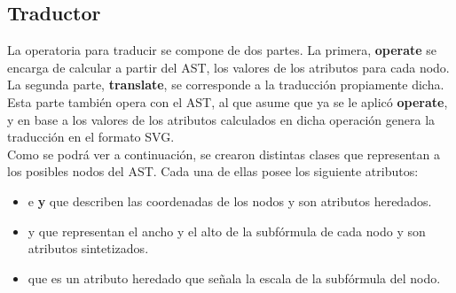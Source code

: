 \subsection{Traductor}

\indent \indent  La operatoria para traducir se compone de dos partes. La primera, \textbf{operate} se encarga de calcular a partir del AST, los valores de los atributos para cada nodo. La segunda parte, \textbf{translate}, se corresponde a la traducción propiamente dicha. Esta parte también opera con el AST, al que asume que ya se le aplicó \textbf{operate}, y en base a los valores de los atributos calculados en dicha operación genera la traducción en el formato SVG.\\
\indent Como se podrá ver a continuación, se crearon distintas clases que representan a los posibles nodos del AST. Cada una de ellas posee los siguiente atributos:

\begin{itemize}
\item  {} e \textbf{y} que describen las coordenadas de los nodos y son atributos heredados.
\item {} y  que representan el ancho y el alto de la subfórmula de cada nodo y son atributos sintetizados.
\item {} que es un atributo heredado que señala la escala de la subfórmula del nodo.
\end{itemize}

